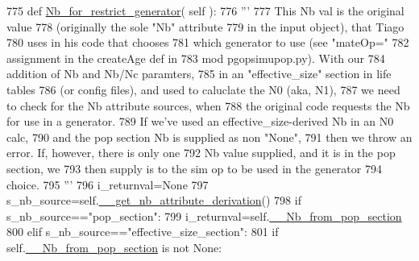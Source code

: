 \begin{DoxyCode}
775     \textcolor{keyword}{def }\hyperlink{classnegui_1_1pginputsimupop_1_1PGInputSimuPop_ac788ef76c43e7e8faca73a1ee82b6da4}{Nb\_for\_restrict\_generator}( self ):
776         \textcolor{stringliteral}{'''}
777 \textcolor{stringliteral}{        This Nb val is the original value}
778 \textcolor{stringliteral}{        (originally the sole "Nb" attribute}
779 \textcolor{stringliteral}{        in the input object), that Tiago }
780 \textcolor{stringliteral}{        uses in his code that chooses}
781 \textcolor{stringliteral}{        which generator to use (see "mateOp="}
782 \textcolor{stringliteral}{        assignment in the createAge def in}
783 \textcolor{stringliteral}{        mod pgopsimupop.py).  With our}
784 \textcolor{stringliteral}{        addition of Nb and Nb/Nc  paramters,}
785 \textcolor{stringliteral}{        in an "effective\_size" section in life tables}
786 \textcolor{stringliteral}{        (or config files), and used to caluclate the N0 (aka, N1),}
787 \textcolor{stringliteral}{        we need to check for the Nb attribute sources, when}
788 \textcolor{stringliteral}{        the original code requests the Nb for use in a generator.}
789 \textcolor{stringliteral}{        If we've used an effective\_size-derived Nb in an N0 calc, }
790 \textcolor{stringliteral}{        and the pop section Nb is supplied as non "None",}
791 \textcolor{stringliteral}{        then we throw an error.  If, however, there is only one}
792 \textcolor{stringliteral}{        Nb value supplied, and it is in the pop section, we }
793 \textcolor{stringliteral}{        then supply is to the sim op to be used in the generator}
794 \textcolor{stringliteral}{        choice.}
795 \textcolor{stringliteral}{        '''}
796         i\_returnval=\textcolor{keywordtype}{None}
797         s\_nb\_source=self.\hyperlink{classnegui_1_1pginputsimupop_1_1PGInputSimuPop_ab22ca7220fa560cf8c7b4d8b6bcb87f3}{\_\_get\_nb\_attribute\_derivation}()
798         \textcolor{keywordflow}{if} s\_nb\_source==\textcolor{stringliteral}{"pop\_section"}:
799             i\_returnval=self.\hyperlink{classnegui_1_1pginputsimupop_1_1PGInputSimuPop_a2525ee53b93e309b99914e0cdf175901}{\_\_Nb\_from\_pop\_section}
800         \textcolor{keywordflow}{elif} s\_nb\_source==\textcolor{stringliteral}{"effective\_size\_section"}:
801             \textcolor{keywordflow}{if} self.\hyperlink{classnegui_1_1pginputsimupop_1_1PGInputSimuPop_a2525ee53b93e309b99914e0cdf175901}{\_\_Nb\_from\_pop\_section} \textcolor{keywordflow}{is} \textcolor{keywordflow}{not} \textcolor{keywordtype}{None}:

\end{DoxyCode}
